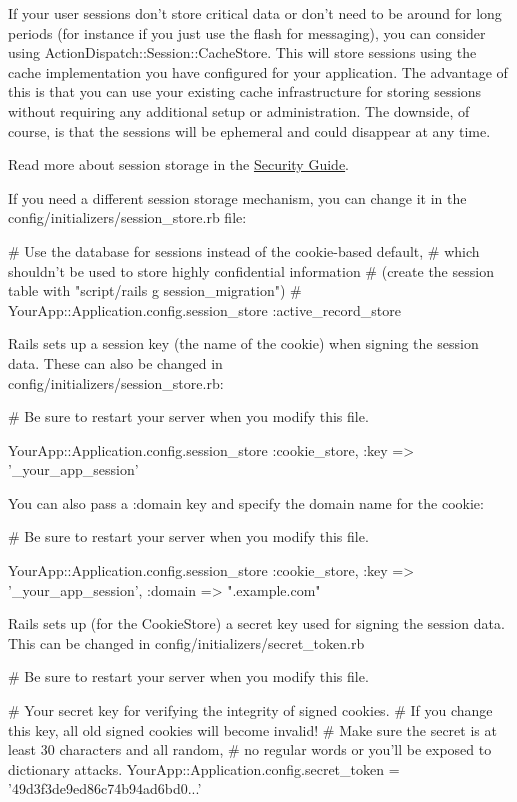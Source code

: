 \documentclass[10pt]{book}
\newenvironment{code}{%
  \scriptsize
    \verbatim
}{%
    \endverbatim
    \newline
}
\begin{document}
If your user sessions don’t store critical data or don’t need to be  around for long periods (for instance if you just use the flash for  messaging), you can consider using ActionDispatch::Session::CacheStore.  This will store sessions using the cache implementation you have  configured for your application. The advantage of this is that you can  use your existing cache infrastructure for storing sessions without  requiring any additional setup or administration. The downside, of  course, is that the sessions will be ephemeral and could disappear at  any time.

Read more about session storage in the \href{http://guides.rubyonrails.org/security.html}{Security Guide}.

If you need a different session storage mechanism, you can change it in the \\ config/initializers/session\_store.rb file:
\begin{code}
# Use the database for sessions instead of the cookie-based default,
# which shouldn't be used to store highly confidential information
# (create the session table with "script/rails g session_migration")
# YourApp::Application.config.session_store :active_record_store
\end{code}

Rails sets up a session key (the name of the cookie) when signing the session data. These can also be changed in \\ config/initializers/session\_store.rb:
\begin{code}
# Be sure to restart your server when you modify this file.
 
YourApp::Application.config.session_store :cookie_store,
                                          :key => '_your_app_session'
\end{code}

You can also pass a :domain key and specify the domain name for the cookie:
\begin{code}
# Be sure to restart your server when you modify this file.
 
YourApp::Application.config.session_store :cookie_store, 
:key => '_your_app_session', :domain => ".example.com"
\end{code}

Rails sets up (for the CookieStore) a secret key used for signing the session data. This can be changed in config/initializers/secret\_token.rb
\begin{code}
# Be sure to restart your server when you modify this file.
 
# Your secret key for verifying the integrity of signed cookies.
# If you change this key, all old signed cookies will become invalid!
# Make sure the secret is at least 30 characters and all random,
# no regular words or you'll be exposed to dictionary attacks.
YourApp::Application.config.secret_token = '49d3f3de9ed86c74b94ad6bd0...'
\end{code}
\end{document}
